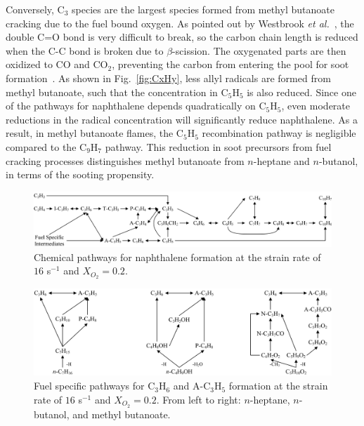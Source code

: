 \documentclass[review,3p,times]{elsarticleUS}
\begin{document}
Conversely, C$_3$ species are the largest species formed from methyl butanoate cracking due to the fuel bound oxygen. As pointed out by Westbrook \emph{et al.}~\cite{westbrook06}, the double C=O bond is very difficult to break, so the carbon chain length is reduced when the C-C bond is broken due to $\beta$-scission. The oxygenated parts are then oxidized to CO and CO$_2$, preventing the carbon from entering the pool for soot formation~\cite{feng12,wangyl11}. As shown in Fig.~\ref{fig:CxHy}, less allyl radicals are formed from methyl butanoate, such that the concentration in C$_5$H$_5$ is also reduced. Since one of the pathways for naphthalene depends quadratically on C$_5$H$_5$, even moderate reductions in the radical concentration will significantly reduce naphthalene. As a result, in methyl butanoate flames, the C$_5$H$_5$ recombination pathway is negligible compared to the C$_9$H$_7$ pathway. This reduction in soot precursors from fuel cracking processes distinguishes methyl butanoate from $n$-heptane and $n$-butanol, in terms of the sooting propensity.

\begin{figure}[ht]
  \centering
  \scriptsize
  \includegraphics[width=1.0\textwidth]{Pathways-PAH.png}
  \normalsize
  \caption{Chemical pathways for naphthalene formation at the strain rate of $16$ s$^{-1}$ and $X_{O_2}=0.2$.}
  \label{fig:Pathways_PAH}
\end{figure}

\begin{figure}[ht]
  \centering
  \scriptsize
  \includegraphics[width=1.0\textwidth]{Pathways_Fuel.png}
  \normalsize
  \caption{Fuel specific pathways for C$_3$H$_6$ and A-C$_3$H$_5$ formation at the strain rate of $16$ s$^{-1}$ and $X_{O_2}=0.2$. From left to right: $n$-heptane, $n$-butanol, and methyl butanoate.}
  \label{fig:Pathways_Fuel}
\end{figure}
\end{document}
